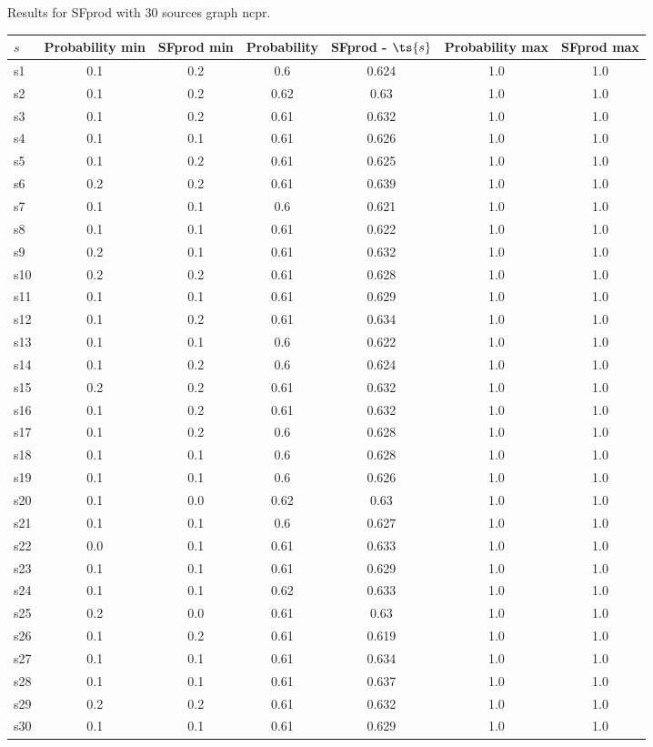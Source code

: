 \documentclass{article}
\begin{document}
\noindent Results for SFprod with 30 sources graph ncpr.

\noindent\begin{tabular}{|l|c|c|c|c|c|c|}
\hline
$s$& Probability min & SFprod min & Probability & SFprod - $\ts{s}$ & Probability max & SFprod max\\
\hline
s1 &0.1 & 0.2 & 0.6 & 0.624 & 1.0 & 1.0\\
\hline
s2 &0.1 & 0.2 & 0.62 & 0.63 & 1.0 & 1.0\\
\hline
s3 &0.1 & 0.2 & 0.61 & 0.632 & 1.0 & 1.0\\
\hline
s4 &0.1 & 0.1 & 0.61 & 0.626 & 1.0 & 1.0\\
\hline
s5 &0.1 & 0.2 & 0.61 & 0.625 & 1.0 & 1.0\\
\hline
s6 &0.2 & 0.2 & 0.61 & 0.639 & 1.0 & 1.0\\
\hline
s7 &0.1 & 0.1 & 0.6 & 0.621 & 1.0 & 1.0\\
\hline
s8 &0.1 & 0.1 & 0.61 & 0.622 & 1.0 & 1.0\\
\hline
s9 &0.2 & 0.1 & 0.61 & 0.632 & 1.0 & 1.0\\
\hline
s10 &0.2 & 0.2 & 0.61 & 0.628 & 1.0 & 1.0\\
\hline
s11 &0.1 & 0.1 & 0.61 & 0.629 & 1.0 & 1.0\\
\hline
s12 &0.1 & 0.2 & 0.61 & 0.634 & 1.0 & 1.0\\
\hline
s13 &0.1 & 0.1 & 0.6 & 0.622 & 1.0 & 1.0\\
\hline
s14 &0.1 & 0.2 & 0.6 & 0.624 & 1.0 & 1.0\\
\hline
s15 &0.2 & 0.2 & 0.61 & 0.632 & 1.0 & 1.0\\
\hline
s16 &0.1 & 0.2 & 0.61 & 0.632 & 1.0 & 1.0\\
\hline
s17 &0.1 & 0.2 & 0.6 & 0.628 & 1.0 & 1.0\\
\hline
s18 &0.1 & 0.1 & 0.6 & 0.628 & 1.0 & 1.0\\
\hline
s19 &0.1 & 0.1 & 0.6 & 0.626 & 1.0 & 1.0\\
\hline
s20 &0.1 & 0.0 & 0.62 & 0.63 & 1.0 & 1.0\\
\hline
s21 &0.1 & 0.1 & 0.6 & 0.627 & 1.0 & 1.0\\
\hline
s22 &0.0 & 0.1 & 0.61 & 0.633 & 1.0 & 1.0\\
\hline
s23 &0.1 & 0.1 & 0.61 & 0.629 & 1.0 & 1.0\\
\hline
s24 &0.1 & 0.1 & 0.62 & 0.633 & 1.0 & 1.0\\
\hline
s25 &0.2 & 0.0 & 0.61 & 0.63 & 1.0 & 1.0\\
\hline
s26 &0.1 & 0.2 & 0.61 & 0.619 & 1.0 & 1.0\\
\hline
s27 &0.1 & 0.1 & 0.61 & 0.634 & 1.0 & 1.0\\
\hline
s28 &0.1 & 0.1 & 0.61 & 0.637 & 1.0 & 1.0\\
\hline
s29 &0.2 & 0.2 & 0.61 & 0.632 & 1.0 & 1.0\\
\hline
s30 &0.1 & 0.1 & 0.61 & 0.629 & 1.0 & 1.0\\
\hline
\end{tabular}\\
\end{document}
